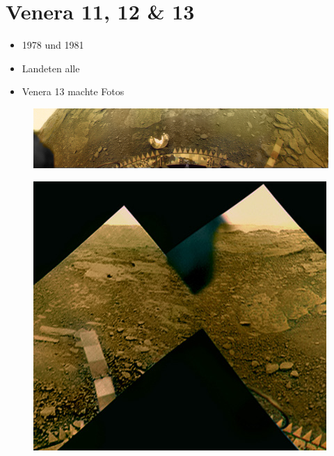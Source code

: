 \documentclass{beamer}
\begin{document}
	\section{Venera 11, 12 \& 13}
	\begin{frame}
		\begin{itemize}
			\item 1978 und 1981
			\item Landeten alle
			\item Venera 13 machte Fotos
		\end{itemize}
	\end{frame}
	\begin{frame}
		\begin{figure}
			\includegraphics[scale=0.25]{./images/venera_13-1}
		\end{figure}
	\end{frame}
	\begin{frame}
		\begin{figure}
			\includegraphics[scale=0.4]{./images/venera_13-2}
		\end{figure}
	\end{frame}
\end{document}
